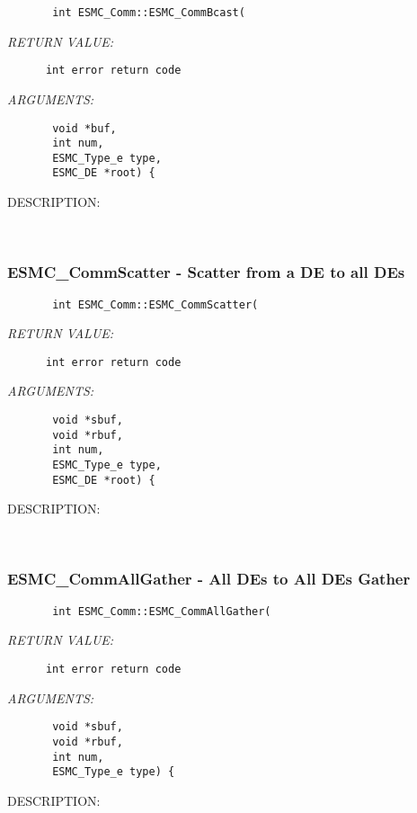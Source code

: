   
\begin{verbatim}       int ESMC_Comm::ESMC_CommBcast(\end{verbatim}{\em RETURN VALUE:}
\begin{verbatim}      int error return code\end{verbatim}{\em ARGUMENTS:}
\begin{verbatim}       void *buf,
       int num,
       ESMC_Type_e type,
       ESMC_DE *root) {\end{verbatim}
{\sf DESCRIPTION:\\ }


        
   
 
\mbox{}\hrulefill\ 
 
\subsubsection{ESMC\_CommScatter - Scatter from a DE to all DEs}


  
\begin{verbatim}       int ESMC_Comm::ESMC_CommScatter(\end{verbatim}{\em RETURN VALUE:}
\begin{verbatim}      int error return code\end{verbatim}{\em ARGUMENTS:}
\begin{verbatim}       void *sbuf,
       void *rbuf,
       int num,
       ESMC_Type_e type,
       ESMC_DE *root) {\end{verbatim}
{\sf DESCRIPTION:\\ }


        
   
 
\mbox{}\hrulefill\ 
 
\subsubsection{ESMC\_CommAllGather - All DEs to All DEs Gather}


  
\begin{verbatim}       int ESMC_Comm::ESMC_CommAllGather(\end{verbatim}{\em RETURN VALUE:}
\begin{verbatim}      int error return code\end{verbatim}{\em ARGUMENTS:}
\begin{verbatim}       void *sbuf,
       void *rbuf,
       int num,
       ESMC_Type_e type) {\end{verbatim}
{\sf DESCRIPTION:\\ }


